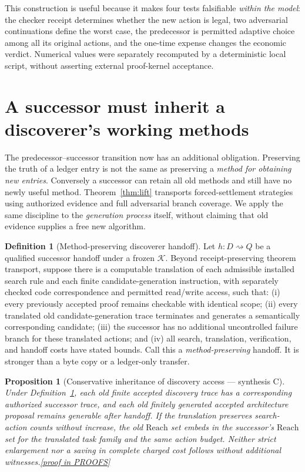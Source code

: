 \documentclass[11pt,letterpaper]{article}
\newtheorem{proposition}[theorem]{Proposition}
\theoremstyle{definition}
\newtheorem{definition}[theorem]{Definition}
\theoremstyle{remark}
\newcommand{\K}{\mathcal K}
\newcommand{\prooflink}[1]{\hfill\hyperlink{proof:#1}{\footnotesize[proof in PROOFS]}}
\begin{document}
This construction is useful because it makes four tests falsifiable \emph{within the model}: the checker receipt determines whether the new action is legal, two adversarial continuations define the worst case, the predecessor is permitted adaptive choice among all its original actions, and the one-time expense changes the economic verdict. Numerical values were separately recomputed by a deterministic local script, without asserting external proof-kernel acceptance.

\section{A successor must inherit a discoverer's working methods}\label{sec:capacity-handoff}
The predecessor--successor transition now has an additional obligation. Preserving the truth of a ledger entry is not the same as preserving a \emph{method for obtaining new entries}. Conversely a successor can retain all old methods and still have no newly useful method. Theorem~\ref{thm:lift} transports forced-settlement strategies using authorized evidence and full adversarial branch coverage. We apply the same discipline to the \emph{generation process} itself, without claiming that old evidence supplies a free new algorithm.

\begin{definition}[Method-preserving discoverer handoff]\label{def:methodhand}
Let $h:D\rightsquigarrow Q$ be a qualified successor handoff under a frozen $\K$. Beyond receipt-preserving theorem transport, suppose there is a computable translation of each admissible installed search rule and each finite candidate-generation instruction, with separately checked code correspondence and permitted read/write access, such that: (i) every previously accepted proof remains checkable with identical scope; (ii) every translated old candidate-generation trace terminates and generates a semantically corresponding candidate; (iii) the successor has no additional uncontrolled failure branch for these translated actions; and (iv) all search, translation, verification, and handoff costs have stated bounds. Call this a \emph{method-preserving} handoff. It is stronger than a byte copy or a ledger-only transfer.
\end{definition}

\begin{proposition}[Conservative inheritance of discovery access --- synthesis C]\label{prop:methodhand}\hypertarget{claim:methodhand}{}
Under Definition~\ref{def:methodhand}, each old finite accepted discovery trace has a corresponding authorized successor trace, and each old finitely generated accepted architecture proposal remains generable after handoff. If the translation preserves search-action counts without increase, the old $\mathrm{Reach}$ set embeds in the successor's $\mathrm{Reach}$ set for the translated task family and the same action budget. Neither strict enlargement nor a saving in complete charged cost follows without additional witnesses.\prooflink{methodhand}
\end{proposition}
\end{document}

